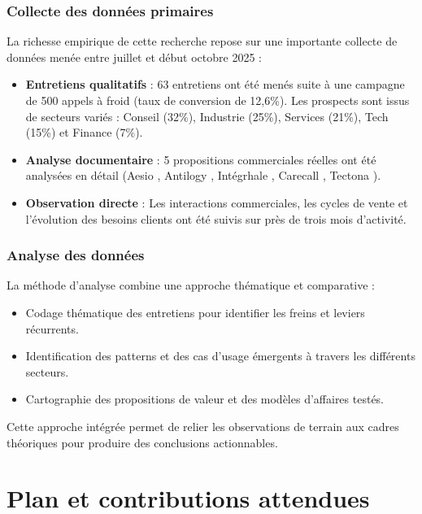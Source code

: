 \subsubsection{Collecte des données primaires}
La richesse empirique de cette recherche repose sur une importante collecte de données menée entre juillet et début octobre 2025 :
\begin{itemize}
    \item \textbf{Entretiens qualitatifs} : 63 entretiens ont été menés suite à une campagne de 500 appels à froid (taux de conversion de 12,6\%). Les prospects sont issus de secteurs variés : Conseil (32\%), Industrie (25\%), Services (21\%), Tech (15\%) et Finance (7\%).
    \item \textbf{Analyse documentaire} : 5 propositions commerciales réelles ont été analysées en détail (Aesio \cite{luwai2025aesio}, Antilogy \cite{luwai2025antilogy}, Intégrhale \cite{luwai2025integrhale}, Carecall \cite{luwai2025carecall}, Tectona \cite{luwai2025tectona}).
    \item \textbf{Observation directe} : Les interactions commerciales, les cycles de vente et l'évolution des besoins clients ont été suivis sur près de trois mois d'activité.
\end{itemize}

\subsubsection{Analyse des données}
La méthode d’analyse combine une approche thématique et comparative :
\begin{itemize}
    \item Codage thématique des entretiens pour identifier les freins et leviers récurrents.
    \item Identification des patterns et des cas d’usage émergents à travers les différents secteurs.
    \item Cartographie des propositions de valeur et des modèles d'affaires testés.
\end{itemize}
\medskip
Cette approche intégrée permet de relier les observations de terrain aux cadres théoriques pour produire des conclusions actionnables.

\section{Plan et contributions attendues}


